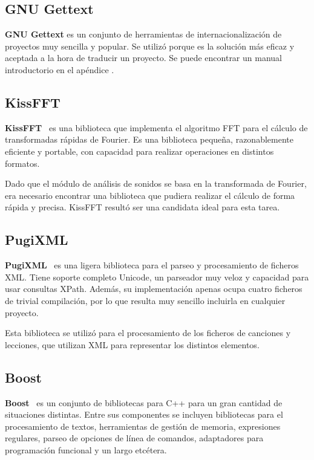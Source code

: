 \subsection{GNU Gettext}

\textbf{GNU Gettext} es un conjunto de herramientas de internacionalización de
proyectos muy sencilla y popular. Se utilizó porque es la solución más eficaz y
aceptada a la hora de traducir un proyecto. Se puede encontrar un manual
introductorio en el apéndice \textit{}.

\subsection{KissFFT}
\textbf{KissFFT}~\cite{kissfft} es una biblioteca que implementa el algoritmo
FFT para el cálculo de transformadas rápidas de Fourier. Es una biblioteca
pequeña, razonablemente eficiente y portable, con capacidad para realizar
operaciones en distintos formatos.

Dado que el módulo de análisis de sonidos se basa en la transformada de Fourier,
era necesario encontrar una biblioteca que pudiera realizar el cálculo de forma
rápida y precisa. KissFFT resultó ser una candidata ideal para esta tarea.

\subsection{PugiXML}
\textbf{PugiXML}~\cite{pugixml} es una ligera biblioteca para el parseo y
procesamiento de ficheros XML. Tiene soporte completo Unicode, un parseador muy
veloz y capacidad para usar consultas XPath. Además, su implementación apenas
ocupa cuatro ficheros de trivial compilación, por lo que resulta muy sencillo
incluirla en cualquier proyecto.

Esta biblioteca se utilizó para el procesamiento de los ficheros de canciones y
lecciones, que utilizan XML para representar los distintos elementos.

\subsection{Boost}
\textbf{Boost}~\cite{boost} es un conjunto de bibliotecas para C++ para un gran
cantidad de situaciones distintas. Entre sus componentes se incluyen bibliotecas
para el procesamiento de textos, herramientas de gestión de memoria, expresiones
regulares, parseo de opciones de línea de comandos, adaptadores para
programación funcional y un largo etcétera.

